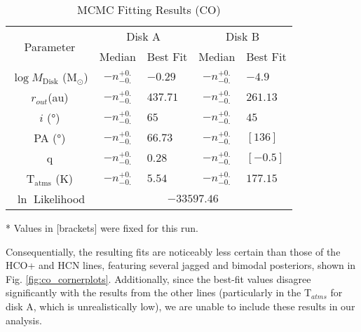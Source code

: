 \begin{table}[h!]
  \centering
  \begin{threeparttable}
    \caption{MCMC Fitting Results (CO)}
    \label{table:fit_co}
    \renewcommand{\arraystretch}{1.2}
    \begin{tabular}{c c l c l }
      \toprule \toprule
      \multirow{2}{*}{Parameter} & \multicolumn{2}{c}{Disk A} & \multicolumn{2}{c}{Disk B} \\
                                 & Median & Best Fit          & Median & Best Fit \\
      \midrule %
      $\log M_\text{Disk}$ (M$_\odot$) & $ -n _{-0.} ^{+0.}$ & $-0.29$    & $ -n _{-0.} ^{+0.}$ & $-4.9$ \\
      $r_{out}$(\si{au})               & $ -n _{-0.} ^{+0.}$ & $437.71$    & $ -n _{-0.} ^{+0.}$  & $261.13$    \\
      $i$ (\si{\degree})               & $ -n _{-0.} ^{+0.}$ & $65$    & $ -n _{-0.} ^{+0.}$ & $45$    \\
      PA  (\si{\degree})               & $ -n _{-0.} ^{+0.}$ & $66.73$  & $ -n _{-0.} ^{+0.}$  & $[136]$  \\
      q                                & $ -n _{-0.} ^{+0.}$ & $0.28$  & $ -n _{-0.} ^{+0.}$  & $[-0.5]$  \\
      T$_\text{atms}$ (K)              & $ -n _{-0.} ^{+0.}$ & $5.54 $  & $ -n _{-0.} ^{+0.}$  & $177.15$  \\
      $\ln$ Likelihood          & \multicolumn{4}{c}{$-33597.46$} \\
      \bottomrule
    \end{tabular}

    \begin{tablenotes}\footnotesize
      \item[*] Values in [brackets] were fixed for this run.
    \end{tablenotes}
  \end{threeparttable}
\end{table}

Consequentially, the resulting fits are noticeably less certain than those of the HCO+ and HCN lines, featuring several jagged and bimodal posteriors, shown in Fig. \ref{fig:co_cornerplots}. Additionally, since the best-fit values disagree significantly with the results from the other lines (particularly in the T$_{atms}$ for disk A, which is unrealistically low), we are unable to include these results in our analysis.


